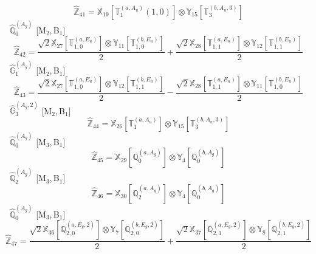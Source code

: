 \documentclass[fleqn,10pt,landscape]{article}
\begin{document}
\begin{itemize}
\begin{dmath*}
\hat{\mathbb{Z}}_{41}=\mathbb{X}_{19}[\mathbb{T}_{1}^{(a,A_{u})}(1,0)] \otimes\mathbb{Y}_{15}[\mathbb{T}_{3}^{(b,A_{u},3)}]
\end{dmath*}
\vspace{4mm}
\noindent {} $\,\,\,\hat{\mathbb{Q}}_{0}^{(A_{g})}$ [M$_{2}$,\,B$_{1}$]
\begin{dmath*}
\hat{\mathbb{Z}}_{42}=\frac{\sqrt{2} \mathbb{X}_{27}[\mathbb{T}_{1,0}^{(a,E_{u})}] \otimes\mathbb{Y}_{11}[\mathbb{T}_{1,0}^{(b,E_{u})}]}{2} + \frac{\sqrt{2} \mathbb{X}_{28}[\mathbb{T}_{1,1}^{(a,E_{u})}] \otimes\mathbb{Y}_{12}[\mathbb{T}_{1,1}^{(b,E_{u})}]}{2}
\end{dmath*}
\vspace{4mm}
\noindent {} $\,\,\,\hat{\mathbb{G}}_{1}^{(A_{g})}$ [M$_{2}$,\,B$_{1}$]
\begin{dmath*}
\hat{\mathbb{Z}}_{43}=\frac{\sqrt{2} \mathbb{X}_{27}[\mathbb{T}_{1,0}^{(a,E_{u})}] \otimes\mathbb{Y}_{12}[\mathbb{T}_{1,1}^{(b,E_{u})}]}{2} - \frac{\sqrt{2} \mathbb{X}_{28}[\mathbb{T}_{1,1}^{(a,E_{u})}] \otimes\mathbb{Y}_{11}[\mathbb{T}_{1,0}^{(b,E_{u})}]}{2}
\end{dmath*}
\vspace{4mm}
\noindent {} $\,\,\,\hat{\mathbb{G}}_{3}^{(A_{g},2)}$ [M$_{2}$,\,B$_{1}$]
\begin{dmath*}
\hat{\mathbb{Z}}_{44}=\mathbb{X}_{26}[\mathbb{T}_{1}^{(a,A_{u})}] \otimes\mathbb{Y}_{15}[\mathbb{T}_{3}^{(b,A_{u},3)}]
\end{dmath*}
\vspace{4mm}
\noindent {} $\,\,\,\hat{\mathbb{Q}}_{0}^{(A_{g})}$ [M$_{3}$,\,B$_{1}$]
\begin{dmath*}
\hat{\mathbb{Z}}_{45}=\mathbb{X}_{29}[\mathbb{Q}_{0}^{(a,A_{g})}] \otimes\mathbb{Y}_{4}[\mathbb{Q}_{0}^{(b,A_{g})}]
\end{dmath*}
\vspace{4mm}
\noindent {} $\,\,\,\hat{\mathbb{Q}}_{2}^{(A_{g})}$ [M$_{3}$,\,B$_{1}$]
\begin{dmath*}
\hat{\mathbb{Z}}_{46}=\mathbb{X}_{30}[\mathbb{Q}_{2}^{(a,A_{g})}] \otimes\mathbb{Y}_{4}[\mathbb{Q}_{0}^{(b,A_{g})}]
\end{dmath*}
\vspace{4mm}
\noindent {} $\,\,\,\hat{\mathbb{Q}}_{0}^{(A_{g})}$ [M$_{3}$,\,B$_{1}$]
\begin{dmath*}
\hat{\mathbb{Z}}_{47}=\frac{\sqrt{2} \mathbb{X}_{36}[\mathbb{Q}_{2,0}^{(a,E_{g},2)}] \otimes\mathbb{Y}_{7}[\mathbb{Q}_{2,0}^{(b,E_{g},2)}]}{2} + \frac{\sqrt{2} \mathbb{X}_{37}[\mathbb{Q}_{2,1}^{(a,E_{g},2)}] \otimes\mathbb{Y}_{8}[\mathbb{Q}_{2,1}^{(b,E_{g},2)}]}{2}

\end{dmath*}
\end{itemize}
\end{document}
